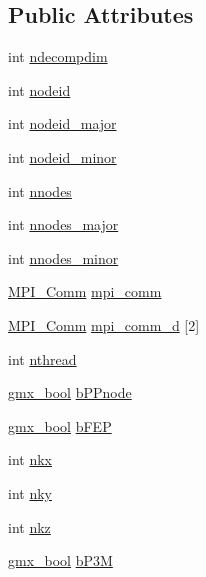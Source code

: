 \subsection*{\-Public \-Attributes}
\begin{DoxyCompactItemize}
\item 
int \hyperlink{structgmx__pme_a7fbc34fb5e1585a6f212f64caf89c6fe}{ndecompdim}
\item 
int \hyperlink{structgmx__pme_aa7884bb9862e5656029e94e41cdbbd80}{nodeid}
\item 
int \hyperlink{structgmx__pme_a8053884233a999b01017da54f80a091f}{nodeid\-\_\-major}
\item 
int \hyperlink{structgmx__pme_afded8bf4ae367ddc72d39f6b94d79f2a}{nodeid\-\_\-minor}
\item 
int \hyperlink{structgmx__pme_a2108ab5d8cc5cf749e7397b261c2e6d5}{nnodes}
\item 
int \hyperlink{structgmx__pme_a208de17eb983ee67cc12641364e0516d}{nnodes\-\_\-major}
\item 
int \hyperlink{structgmx__pme_af6bdb6b28b5d117c2c3fe538e041a6f9}{nnodes\-\_\-minor}
\item 
\hyperlink{include_2thread__mpi_2mpi__bindings_8h_a3880364558bd42f832e48ed33e6fafbb}{\-M\-P\-I\-\_\-\-Comm} \hyperlink{structgmx__pme_a9ea2e9b4bbb85a531903d646269686e5}{mpi\-\_\-comm}
\item 
\hyperlink{include_2thread__mpi_2mpi__bindings_8h_a3880364558bd42f832e48ed33e6fafbb}{\-M\-P\-I\-\_\-\-Comm} \hyperlink{structgmx__pme_ad63c3f491d1d19a029771bab3a0d9603}{mpi\-\_\-comm\-\_\-d} \mbox{[}2\mbox{]}
\item 
int \hyperlink{structgmx__pme_ad51b8f66ba3cb835b5125397c7d8d55e}{nthread}
\item 
\hyperlink{include_2types_2simple_8h_a8fddad319f226e856400d190198d5151}{gmx\-\_\-bool} \hyperlink{structgmx__pme_a7499bad5129d046e37a0bcbbdc36fde2}{b\-P\-Pnode}
\item 
\hyperlink{include_2types_2simple_8h_a8fddad319f226e856400d190198d5151}{gmx\-\_\-bool} \hyperlink{structgmx__pme_aca424ae5cab42d38870b30f03525858b}{b\-F\-E\-P}
\item 
int \hyperlink{structgmx__pme_af66746588979d3c8f0f59c330fd7cb3c}{nkx}
\item 
int \hyperlink{structgmx__pme_a15d0e41953e1f70875c54a360920064e}{nky}
\item 
int \hyperlink{structgmx__pme_ad6bf4000528f90255339a3c0c55516e3}{nkz}
\item 
\hyperlink{include_2types_2simple_8h_a8fddad319f226e856400d190198d5151}{gmx\-\_\-bool} \hyperlink{structgmx__pme_af00c3a627847810d95604387fb010a2e}{b\-P3\-M}

\end{DoxyCompactItemize}
